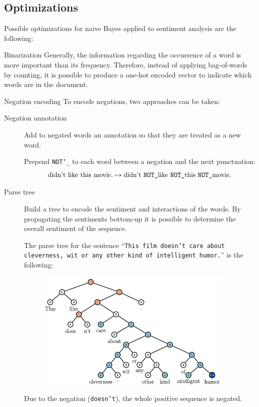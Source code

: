 \subsection{Optimizations}

Possible optimizations for naive Bayes applied to sentiment analysis are the following:
\begin{descriptionlist}
    \item[Binarization] 
        Generally, the information regarding the occurrence of a word is more important than its frequency. Therefore, instead of applying bag-of-words by counting, it is possible to produce a one-hot encoded vector to indicate which words are in the document.

    \item[Negation encoding] 
        To encode negations, two approaches can be taken:
        \begin{description}
            \item[Negation annotation]
                Add to negated words an annotation so that they are treated as a new word.
                \begin{example}
                    Prepend \texttt{NOT\char`_} to each word between a negation and the next punctuation:
                    \[ \text{didn't like this movie.} \mapsto \text{didn't \texttt{NOT\char`_}like \texttt{NOT\char`_}this \texttt{NOT\char`_}movie.} \]
                \end{example}

            \item[Parse tree]
                Build a tree to encode the sentiment and interactions of the words. By propagating the sentiments bottom-up it is possible to determine the overall sentiment of the sequence.

                \begin{example}
                    The parse tree for the sentence ``\texttt{This film doesn't care about cleverness, wit or any other kind of intelligent humor.}'' is the following:
                    \begin{figure}[H]
                        \centering
                        \includegraphics[width=0.6\linewidth]{./img/_sentiment_parse_tree.pdf}
                    \end{figure}
                    Due to the negation (\texttt{doesn't}), the whole positive sequence is negated.
                \end{example}
        \end{description}


\end{descriptionlist}
